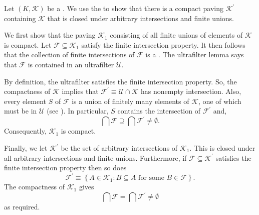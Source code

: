 \documentclass[12pt]{article}
\begin{document}

Let $(K,\mathcal{K})$ be a . We use the  to show that there is a compact paving $\mathcal{K}^\prime$ containing $\mathcal{K}$ that is closed under arbitrary intersections and finite unions.

We first show that the paving $\mathcal{K}_1$ consisting of all finite unions of elements of $\mathcal{K}$ is compact.
Let $\mathcal{F}\subseteq\mathcal{K}_1$ satisfy the finite intersection property. It then follows that the collection of finite intersections of $\mathcal{F}$ is a . The ultrafilter lemma says that $\mathcal{F}$ is contained in an ultrafilter $\mathcal{U}$.

By definition, the ultrafilter satisfies the finite intersection property. So, the compactness of $\mathcal{K}$ implies that $\mathcal{F}^\prime\equiv\mathcal{U}\cap\mathcal{K}$ has nonempty intersection.
Also, every element $S$ of $\mathcal{F}$ is a union of finitely many elements of $\mathcal{K}$, one of which must be in $\mathcal{U}$ (see ). In particular, $S$ contains the intersection of $\mathcal{F}^\prime$ and,
\begin{equation*}
\bigcap\mathcal{F}\supseteq\bigcap\mathcal{F}^\prime\not=\emptyset.
\end{equation*}
Consequently, $\mathcal{K}_1$ is compact.

Finally, we let $\mathcal{K}^\prime$ be the set of arbitrary intersections of $\mathcal{K}_1$. This is closed under all arbitrary intersections and finite unions. Furthermore, if $\mathcal{F}\subseteq\mathcal{K}^\prime$ satisfies the finite intersection property then so does
\begin{equation*}
\mathcal{F}^\prime\equiv\left\{A\in \mathcal{K}_1\colon B\subseteq A\text{ for some }B\in\mathcal{F}\right\}.
\end{equation*}
The compactness of $\mathcal{K}_1$ gives
\begin{equation*}
\bigcap\mathcal{F}=\bigcap\mathcal{F}^\prime\not=\emptyset
\end{equation*}
as required.

\end{document}
